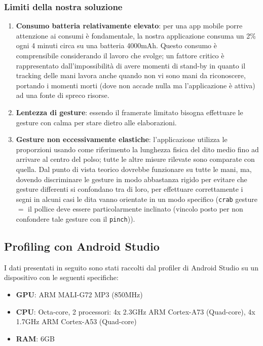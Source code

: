 \subsubsection{Limiti della nostra soluzione}
\begin{enumerate}
    \item \textbf{Consumo batteria relativamente elevato}: per una app mobile porre attenzione ai consumi è fondamentale, la nostra applicazione consuma un 2\% ogni 4 minuti circa su una batteria 4000mAh. Questo consumo è comprensibile considerando il lavoro che svolge; un fattore critico è rappresentato dall'impossibilità di avere momenti di stand-by in quanto il tracking delle mani lavora anche quando non vi sono mani da riconoscere, portando i momenti morti (dove non accade nulla ma l'applicazione è attiva) ad una fonte di spreco risorse.
    \item \textbf{Lentezza di gesture}: essendo il framerate limitato bisogna effettuare le gesture con calma per stare dietro alle elaborazioni.
    \item \textbf{Gesture non eccessivamente elastiche}: l'applicazione utilizza le proporzioni usando come riferimento la lunghezza fisica del dito medio fino ad arrivare al centro del polso; tutte le altre misure rilevate sono comparate con quella. Dal punto di vista teorico dovrebbe funzionare su tutte le mani, ma, dovendo discriminare le gesture in modo abbastanza rigido per evitare che gesture differenti si confondano tra di loro, per effettuare correttamente i segni in alcuni casi le dita vanno orientate in un modo specifico (\texttt{crab} gesture $=$ il pollice deve essere particolarmente inclinato (vincolo posto per non confondere tale gesture con il \texttt{pinch})).
\end{enumerate}

\subsection{Profiling con Android Studio}
I dati presentati in seguito sono stati raccolti dal profiler di Android Studio su un dispositivo con le seguenti specifiche:
\begin{itemize}
    \item \textbf{GPU}: ARM MALI-G72 MP3 (850MHz)
    \item \textbf{CPU}: Octa-core, 2 processori: 4x 2.3GHz ARM Cortex-A73 (Quad-core), 4x 1.7GHz ARM Cortex-A53 (Quad-core)
    \item \textbf{RAM}: 6GB
\end{itemize}


